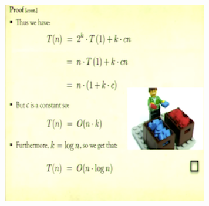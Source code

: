 \documentclass[12pt]{article}
\begin{document}
\begin{itemize}
\begin{itemize}
\begin{itemize}
\begin{itemize}
\begin{enumerate}
\begin{center}
				\includegraphics{lecture2c}
				\end{center}
				\end{enumerate}
			\end{itemize}
		\end{itemize}
	\end{itemize}
\end{itemize}
\end{document}
